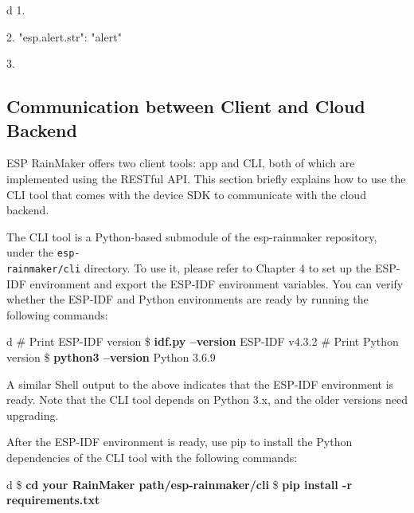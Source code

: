 \documentclass[a4paper,12pt]{book}
\begin{document}
\begin{codebloc}
\begin{tabular}{d}
1.  {

2.      "esp.alert.str": "alert"

3.  }
\end{tabular}
\end{codebloc}

\subsection{Communication between Client and Cloud Backend}
ESP RainMaker offers two client tools: app and CLI, both of which are implemented using the RESTful API. This section briefly explains how to use the CLI tool that comes with the device SDK to communicate with the cloud backend.

The CLI tool is a Python-based submodule of the esp-rainmaker repository, under the \verb|esp-|\\ \verb|rainmaker/cli| directory. To use it, please refer to Chapter 4 to set up the ESP-IDF environment and export the ESP-IDF environment variables. You can verify whether the ESP-IDF and Python environments are ready by running the following commands:

\begin{codebloc}
\begin{tabular}{d}
\# Print ESP-IDF version\newline
\$ \textbf{idf.py --version}\newline
ESP-IDF v4.3.2\newline
\vspace{10pt}
\# Print Python version\newline
\$ \textbf{python3 --version}\newline
Python 3.6.9
\end{tabular}
\end{codebloc}

A similar Shell output to the above indicates that the ESP-IDF environment is ready. Note that the CLI tool depends on Python 3.x, and the older versions need upgrading.

After the ESP-IDF environment is ready, use pip to install the Python dependencies of the CLI tool with the following commands:

\begin{codebloc}
\begin{tabular}{d}
\$ \textbf{cd {your RainMaker path}/esp-rainmaker/cli}\newline
\$ \textbf{pip install -r requirements.txt}
\end{tabular}
\end{codebloc}
\end{document}
